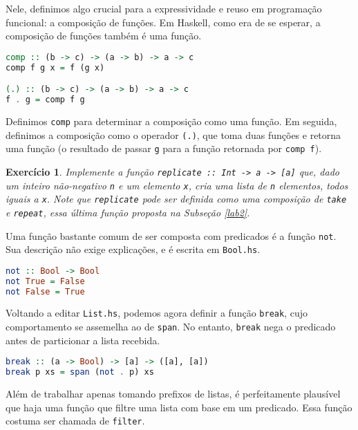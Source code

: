 \documentclass[a4paper]{article}
\newtheorem{exercicio}{Exercício}
\begin{document}
Nele, definimos algo crucial para a expressividade e reuso em programação funcional: a composição de funções.
Em Haskell, como era de se esperar, a composição de funções também é uma função.

\begin{lstlisting}[language=haskell, frame=single]
comp :: (b -> c) -> (a -> b) -> a -> c
comp f g x = f (g x)

(.) :: (b -> c) -> (a -> b) -> a -> c
f . g = comp f g
\end{lstlisting}

Definimos \texttt{comp} para determinar a composição como uma função.
Em seguida, definimos a composição como o operador \texttt{(.)}, que toma duas funções e retorna uma função (o resultado de passar \texttt{g} para a função retornada por \texttt{comp f}).

\begin{exercicio}
	Implemente a função \emph{\texttt{replicate :: Int -> a -> [a]}} que, dado um inteiro não-negativo \emph{\texttt{n}} e um elemento \emph{\texttt{x}}, cria uma lista de \emph{\texttt{n}} elementos, todos iguais a \emph{\texttt{x}}.
	Note que \emph{\texttt{replicate}} pode ser definida como uma composição de \emph{\texttt{take}} e \emph{\texttt{repeat}}, essa última função proposta na Subseção \ref{lab2}.
\end{exercicio}

Uma função bastante comum de ser composta com predicados é a função \texttt{not}.
Sua descrição não exige explicações, e é escrita em \texttt{Bool.hs}.

\begin{lstlisting}[language=haskell, frame=single]
not :: Bool -> Bool
not True = False
not False = True
\end{lstlisting}

Voltando a editar \texttt{List.hs}, podemos agora definir a função \texttt{break}, cujo comportamento se assemelha ao de \texttt{span}.
No entanto, \texttt{break} nega o predicado antes de particionar a lista recebida.

\begin{lstlisting}[language=haskell, frame=single]
break :: (a -> Bool) -> [a] -> ([a], [a])
break p xs = span (not . p) xs
\end{lstlisting}

Além de trabalhar apenas tomando prefixos de listas, é perfeitamente plausível que haja uma função que filtre uma lista com base em um predicado.
Essa função costuma ser chamada de \texttt{filter}.
\end{document}
